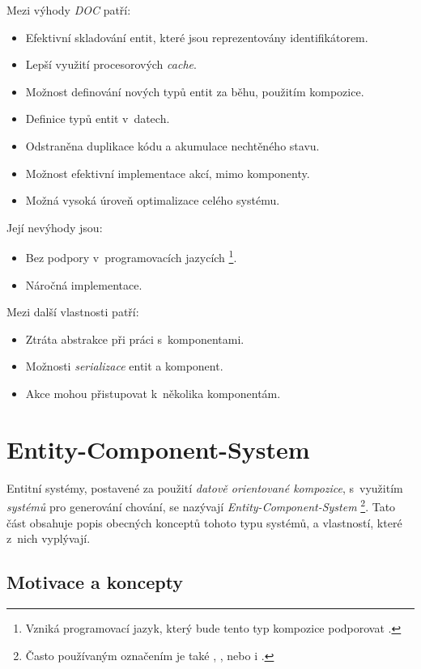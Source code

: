 \noindent Mezi výhody \emph{DOC} patří: 
\begin{itemize}
	\item Efektivní skladování entit, které jsou reprezentovány identifikátorem.
	\item Lepší využití procesorových \emph{cache}.
	\item Možnost definování nových typů entit za běhu, použitím kompozice.
	\item Definice typů entit v~datech.
	\item Odstraněna duplikace kódu a akumulace nechtěného stavu.
	\item Možnost efektivní implementace akcí, mimo komponenty.
	\item Možná vysoká úroveň optimalizace celého systému.
\end{itemize}

\noindent Její nevýhody jsou: 
\begin{itemize}
	\item Bez podpory v~programovacích jazycích \footnote{Vzniká programovací jazyk, který bude tento typ kompozice podporovat \cite{OOHLang}.}.
	\item Náročná implementace.
\end{itemize}

\pagebreak

\noindent Mezi další vlastnosti patří:
\begin{itemize}
	\item Ztráta abstrakce při práci s~komponentami.
	\item Možnosti \emph{serializace} entit a komponent.
	\item Akce mohou přistupovat k~několika komponentám.
\end{itemize}

\section{Entity-Component-System}
\label{Chap:EntitySystem} 

Entitní systémy, postavené za použití \emph{datově orientované kompozice}, s~využitím \emph{systémů} pro generování chování, se nazývají \emph{Entity-Component-System}  \footnote{Často používaným označením je také ,  , nebo i .}. Tato část obsahuje popis obecných konceptů tohoto typu systémů, a vlastností, které z~nich vyplývají.

\subsection{Motivace a koncepty}

